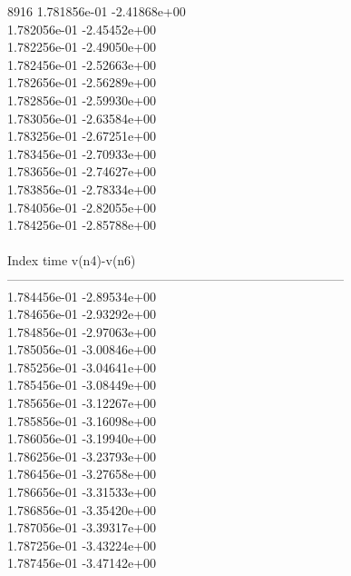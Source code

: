 8916	1.781856e-01	-2.41868e+00	\\ 	1.782056e-01	-2.45452e+00	\\ 	1.782256e-01	-2.49050e+00	\\ 	1.782456e-01	-2.52663e+00	\\ 	1.782656e-01	-2.56289e+00	\\ 	1.782856e-01	-2.59930e+00	\\ 	1.783056e-01	-2.63584e+00	\\ 	1.783256e-01	-2.67251e+00	\\ 	1.783456e-01	-2.70933e+00	\\ 	1.783656e-01	-2.74627e+00	\\ 	1.783856e-01	-2.78334e+00	\\ 	1.784056e-01	-2.82055e+00	\\ 	1.784256e-01	-2.85788e+00	\\ \hline
\\ \hline
Index   time            v(n4)-v(n6)     \\ \hline
--------------------------------------------------------------------------------\\ 	1.784456e-01	-2.89534e+00	\\ 	1.784656e-01	-2.93292e+00	\\ 	1.784856e-01	-2.97063e+00	\\ 	1.785056e-01	-3.00846e+00	\\ 	1.785256e-01	-3.04641e+00	\\ 	1.785456e-01	-3.08449e+00	\\ 	1.785656e-01	-3.12267e+00	\\ 	1.785856e-01	-3.16098e+00	\\ 	1.786056e-01	-3.19940e+00	\\ 	1.786256e-01	-3.23793e+00	\\ 	1.786456e-01	-3.27658e+00	\\ 	1.786656e-01	-3.31533e+00	\\ 	1.786856e-01	-3.35420e+00	\\ 	1.787056e-01	-3.39317e+00	\\ 	1.787256e-01	-3.43224e+00	\\ 	1.787456e-01	-3.47142e+00	\\ \hline
